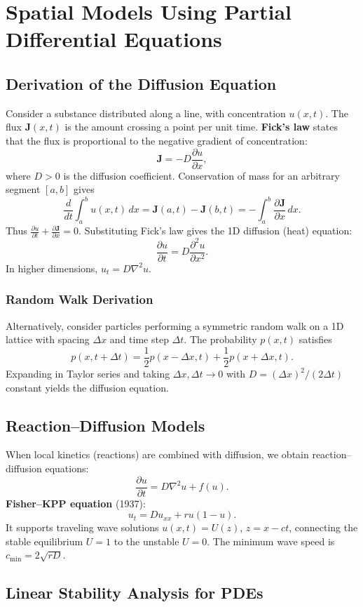 \documentclass[12pt,a4paper]{book}
\begin{document}
\chapter{Spatial Models Using Partial Differential Equations}
\section{Derivation of the Diffusion Equation}
Consider a substance distributed along a line, with concentration $u(x,t)$. The flux $\mathbf{J}(x,t)$ is the amount crossing a point per unit time. \textbf{Fick’s law} states that the flux is proportional to the negative gradient of concentration:
\[
\mathbf{J} = -D \frac{\partial u}{\partial x},
\]
where $D>0$ is the diffusion coefficient. Conservation of mass for an arbitrary segment $[a,b]$ gives
\[
\frac{d}{dt} \int_a^b u(x,t)\,dx = \mathbf{J}(a,t) - \mathbf{J}(b,t) = -\int_a^b \frac{\partial \mathbf{J}}{\partial x}\,dx.
\]
Thus $\frac{\partial u}{\partial t} + \frac{\partial \mathbf{J}}{\partial x} = 0$. Substituting Fick’s law gives the 1D diffusion (heat) equation:
\[
\frac{\partial u}{\partial t} = D \frac{\partial^2 u}{\partial x^2}.
\]
In higher dimensions, $u_t = D \nabla^2 u$.

\subsection{Random Walk Derivation}
Alternatively, consider particles performing a symmetric random walk on a 1D lattice with spacing $\Delta x$ and time step $\Delta t$. The probability $p(x,t)$ satisfies
\[
p(x,t+\Delta t) = \frac{1}{2} p(x-\Delta x,t) + \frac{1}{2} p(x+\Delta x,t).
\]
Expanding in Taylor series and taking $\Delta x, \Delta t \to 0$ with $D = (\Delta x)^2/(2\Delta t)$ constant yields the diffusion equation.

\section{Reaction–Diffusion Models}
When local kinetics (reactions) are combined with diffusion, we obtain reaction–diffusion equations:
\[
\frac{\partial u}{\partial t} = D \nabla^2 u + f(u).
\]
\textbf{Fisher–KPP equation} (1937):
\[
u_t = D u_{xx} + r u (1 - u).
\]
It supports traveling wave solutions $u(x,t) = U(z)$, $z = x - ct$, connecting the stable equilibrium $U=1$ to the unstable $U=0$. The minimum wave speed is $c_{\min} = 2\sqrt{rD}$.

\section{Linear Stability Analysis for PDEs}
\end{document}
